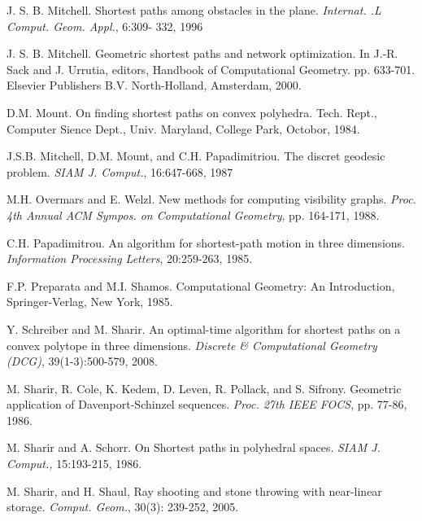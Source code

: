 \documentclass{llncs}
\begin{document}
\begin{thebibliography}{}
J. S. B. Mitchell.
Shortest paths among obstacles in the plane.
{\it Internat. .L Comput. Geom. Appl.}, 6:309- 332, 1996

J. S. B. Mitchell.
Geometric shortest paths and network optimization.
In J.-R. Sack and J. Urrutia, editors, Handbook of Computational Geometry.
pp. 633-701. Elsevier Publishers B.V. North-Holland, Amsterdam, 2000.

D.M. Mount.
On finding shortest paths on convex polyhedra.
Tech. Rept., Computer Sience Dept., Univ. Maryland, College Park, Octobor, 1984.

J.S.B. Mitchell, D.M. Mount, and C.H. Papadimitriou.
The discret geodesic problem.
{\it SIAM J. Comput.}, 16:647-668, 1987

M.H. Overmars and E. Welzl.
New methods for computing visibility graphs.
{\it Proc. 4th Annual ACM Sympos. on Computational Geometry}, pp. 164-171, 1988.

C.H. Papadimitrou.
An algorithm for shortest-path motion in three dimensions.
{\it Information Processing Letters}, 20:259-263, 1985.

F.P. Preparata and M.I. Shamos.
Computational Geometry: An Introduction, Springer-Verlag, New York, 1985.

Y. Schreiber and M. Sharir.
An optimal-time algorithm for shortest paths on a convex polytope in three dimensions.
\emph{Discrete \& Computational Geometry (DCG)}, 39(1-3):500-579, 2008.

M. Sharir, R. Cole, K. Kedem, D. Leven, R. Pollack, and S. Sifrony.
Geometric application of Davenport-Schinzel sequences.
{\it Proc. 27th IEEE FOCS}, pp. 77-86, 1986.

M. Sharir and A. Schorr.
On Shortest paths in polyhedral spaces.
{\it SIAM J. Comput.,} 15:193-215, 1986.

M. Sharir, and H. Shaul,
Ray shooting and stone throwing with near-linear storage.
{\it Comput. Geom.}, 30(3): 239-252, 2005.


\end{thebibliography}
\end{document}
